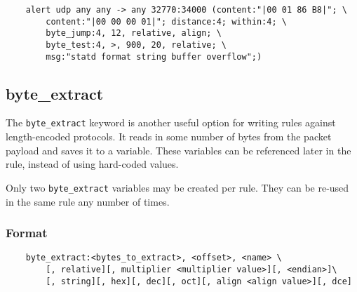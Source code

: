 \documentclass[english]{report}
\newenvironment{note}{
\samepage
    \vspace{10pt}{\textsf{
        {\hspace{7pt}\Huge{$\triangle$\hspace{-12.5pt}{\Large{$^!$}}}}\hspace{5pt}
        {\Large{NOTE}}
    }
    }
   \begin{center}
    \par\vspace{-17pt}

    \begin{lrbox}{\savepar}
    \begin{minipage}[r]{6in}
}
{
    \end{minipage}
    \end{lrbox}
    \fbox{
        \usebox{
            \savepar
	}
    }
    \par\vskip10pt
    \end{center}
}
\newenvironment{note}{
        \begin{rawhtml}
        <p><table border="1"><tr><td><b>
        Note:&nbsp;&nbsp;</b>
        \end{rawhtml}
}{
        \begin{rawhtml}
        </b></td></tr></table></p>
        \end{rawhtml}
}
\begin{document}
\begin{verbatim}
    alert udp any any -> any 32770:34000 (content:"|00 01 86 B8|"; \
        content:"|00 00 00 01|"; distance:4; within:4; \
        byte_jump:4, 12, relative, align; \
        byte_test:4, >, 900, 20, relative; \
        msg:"statd format string buffer overflow";)
\end{verbatim}

\subsection{byte\_extract}
\label{byte_extract}

The \texttt{byte\_extract} keyword is another useful option for writing rules
against length-encoded protocols. It reads in some number of bytes from the
packet payload and saves it to a variable. These variables can be referenced
later in the rule, instead of using hard-coded values.

\begin{note}

Only two \texttt{byte\_extract} variables may be created per rule. They can be
re-used in the same rule any number of times.

\end{note}

\subsubsection{Format}

\begin{verbatim}
    byte_extract:<bytes_to_extract>, <offset>, <name> \
        [, relative][, multiplier <multiplier value>][, <endian>]\ 
        [, string][, hex][, dec][, oct][, align <align value>][, dce]
\end{verbatim}
\end{document}

